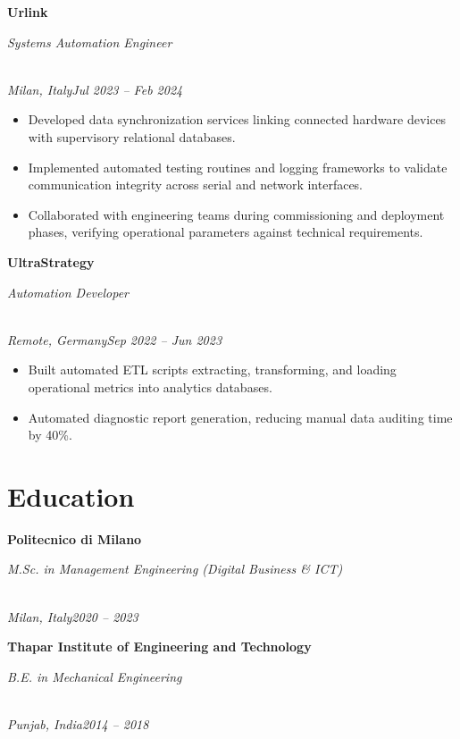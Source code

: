 \documentclass[a4paper,10pt]{article}
\newcommand{\role}[4]{\vspace{3pt}\noindent\hspace{0.6em}\parbox[t]{0.38\textwidth}{\raggedright\textbf{#1}}\hfill\parbox[t]{0.58\textwidth}{\raggedleft\textit{#2}}\\{\textit{#3}\hfill\textit{#4}}\vspace{1pt}}
\begin{document}
\role{Urlink}{Systems Automation Engineer}{Milan, Italy}{Jul 2023 -- Feb 2024}
\begin{itemize}
\item Developed data synchronization services linking connected hardware devices with supervisory relational databases.
\item Implemented automated testing routines and logging frameworks to validate communication integrity across serial and network interfaces.
\item Collaborated with engineering teams during commissioning and deployment phases, verifying operational parameters against technical requirements.
\end{itemize}

\role{UltraStrategy}{Automation Developer}{Remote, Germany}{Sep 2022 -- Jun 2023}
\begin{itemize}
\item Built automated ETL scripts extracting, transforming, and loading operational metrics into analytics databases.
\item Automated diagnostic report generation, reducing manual data auditing time by 40\%.
\end{itemize}

\section{Education}
\role{Politecnico di Milano}{M.Sc. in Management Engineering (Digital Business \& ICT)}{Milan, Italy}{2020 -- 2023}
\role{Thapar Institute of Engineering and Technology}{B.E. in Mechanical Engineering}{Punjab, India}{2014 -- 2018}
\end{document}

